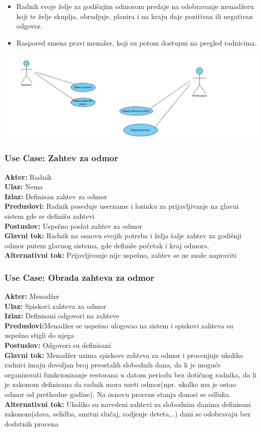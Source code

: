 \documentclass{article}
\begin{document}
\begin{itemize}
\item Radnik svoje želje za godišnjim odmorom predaje na odobravanje menadžeru koji te želje skuplja, obradjuje, planira i na kraju daje pozitivan ili negativan odgovor.
\item Raspored smena pravi menažer, koji su potom dostupni na pregled radnicima.
\end{itemize}
\includegraphics[width=\textwidth]{SU_4_hr.png}
\subsubsection{\textbf{Use Case}: Zahtev za odmor}
\textbf{Akter:} Radnik\\
\textbf{Ulaz:} Nema\\
\textbf{Izlaz:} Definisan zahtev za odmor\\
\textbf{Preduslovi:} Radnik poseduje username i lozinku za prijavljivanje na glavni sistem gde se definišu zahtevi\\
\textbf{Postuslov:} Uspešno poslat zahtev za odmor\\
\textbf{Glavni tok:} Radnik na osnovu svojih potreba i želja šalje zahtev za godišnji odmor putem glavnog sistema, gde definiše početak i kraj odmora.\\
\textbf{Alternativni tok:} Prijavljivanje nije uspešno, zahtev se ne može napraviti\\

\subsubsection{\textbf{Use Case}: Obrada zahteva za odmor}
\textbf{Akter:} Menadžer\\
\textbf{Ulaz:} Spiskovi zahteva za odmor\\
\textbf{Izlaz:} Definisani odgovori na zahteve\\
\textbf{Preduslovi:}Menadžer se uspešno ulogovao na sistem i spiskovi zahteva su uspešno stigli do njega\\
\textbf{Postuslov:} Odgovori su definisani\\
\textbf{Glavni tok:} Menadžer uzima spiskove zahteva za odmor i procenjuje ukoliko radnici imaju dovoljan broj preostalih slobodnih dana, da li je moguće organizovati funkcionisanje restorana u datom periodu bez dotičnog radnika, da li je zakonom definisano da radnik mora uzeti odmor(npr. ukolko mu je ostao odmor od prethodne godine). Na osnovu procene stanja donosi se odluka.
\textbf{Alternativni tok:} Ukoliko su navedeni zahtevi za slobodnim danima definisani zakonom(slava, selidba, smrtni slučaj, rodjenje deteta,..) dani se odobravaju bez dodatnih procena\\
\end{document}
